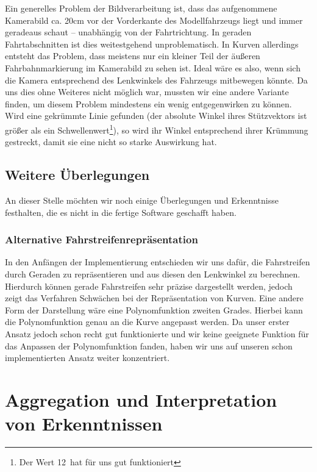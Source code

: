 \documentclass[a4paper,12pt]{report}
\begin{document}
	Ein generelles Problem der Bildverarbeitung ist, dass das aufgenommene Kamerabild ca. 20cm vor der Vorderkante des Modellfahrzeugs liegt und immer geradeaus schaut -- unabhängig von der Fahrtrichtung.
	In geraden Fahrtabschnitten ist dies weitestgehend unproblematisch.
	In Kurven allerdings entsteht das Problem, dass meistens nur ein kleiner Teil der äußeren Fahrbahnmarkierung im Kamerabild zu sehen ist.
	Ideal wäre es also, wenn sich die Kamera entsprechend des Lenkwinkels des Fahrzeugs mitbewegen könnte.
	Da uns dies ohne Weiteres nicht möglich war, mussten wir eine andere Variante finden, um diesem Problem mindestens ein wenig entgegenwirken zu können.
	Wird eine gekrümmte Linie gefunden (der absolute Winkel ihres Stützvektors ist größer als ein Schwellenwert\footnote{Der Wert 12\degree\ hat für uns gut funktioniert}), so wird ihr Winkel entsprechend ihrer Krümmung gestreckt, damit sie eine nicht so starke Auswirkung hat.	

\section{Weitere Überlegungen}

	An dieser Stelle möchten wir noch einige Überlegungen und Erkenntnisse festhalten,
	die es nicht in die fertige Software geschafft haben.

\subsection{Alternative Fahrstreifenrepräsentation}

	In den Anfängen der Implementierung entschieden wir uns dafür, die Fahrstreifen durch Geraden zu repräsentieren und aus diesen den Lenkwinkel zu berechnen.
	Hierdurch können gerade Fahrstreifen sehr präzise dargestellt werden, jedoch zeigt das Verfahren Schwächen bei der Repräsentation von Kurven.
	Eine andere Form der Darstellung wäre eine Polynomfunktion zweiten Grades.
	Hierbei kann die Polynomfunktion genau an die Kurve angepasst werden.
	Da unser erster Ansatz jedoch schon recht gut funktionierte und wir keine geeignete Funktion für das Anpassen der Polynomfunktion fanden, haben wir uns auf unseren schon implementierten Ansatz weiter konzentriert.

\chapter{Aggregation und Interpretation von Erkenntnissen}
\end{document}
